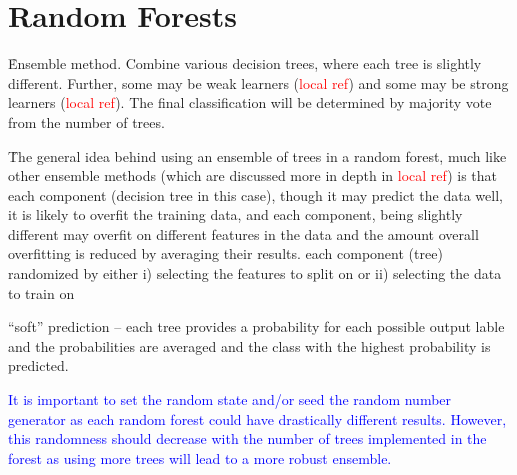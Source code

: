 \section{Random Forests}

\r{Ensemble method. Combine various decision trees, where each tree is slightly different. Further, some may be weak learners (\textcolor{red}{local ref}) and some may be strong learners (\textcolor{red}{local ref}). The final classification will be determined by majority vote from the number of trees.}

\r{The general idea behind using an ensemble of trees in a random forest, much like other ensemble methods (which are discussed more in depth in \textcolor{red}{local ref}) is that each component (decision tree in this case), though it may predict the data well, it is likely to overfit the training data, and each component, being slightly different may overfit on different features in the data and the amount overall overfitting is reduced by averaging their results.  each component (tree) randomized by either i) selecting the features to split on or ii) selecting the data to train on}

\r{``soft'' prediction -- each tree provides a probability for each possible output lable and the probabilities are averaged and the class with the highest probability is predicted.}


\textcolor{blue}{It is important to set the random state and/or seed the random number generator as each random forest could have drastically different results. However, this randomness should decrease with the number of trees implemented in the forest as using more trees will lead to a more robust ensemble.}



